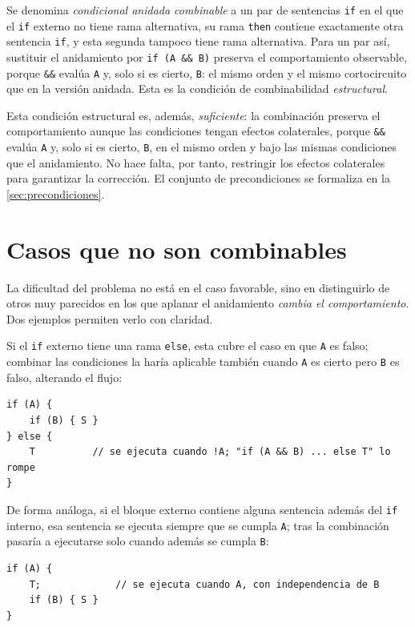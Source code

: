 Se denomina \emph{condicional anidada combinable} a un par de sentencias
\lstinline|if| en el que el \lstinline|if| externo no tiene rama alternativa,
su rama \lstinline|then| contiene exactamente otra sentencia \lstinline|if|, y
esta segunda tampoco tiene rama alternativa. Para un par así, sustituir el
anidamiento por \lstinline|if (A && B)| preserva el comportamiento observable,
porque \lstinline|&&| evalúa \lstinline|A| y, solo si es cierto,
\lstinline|B|: el mismo orden y el mismo cortocircuito que en la versión
anidada. Esta es la condición de combinabilidad \emph{estructural}.

Esta condición estructural es, además, \emph{suficiente}: la combinación
preserva el comportamiento aunque las condiciones tengan efectos colaterales,
porque \lstinline|&&| evalúa \lstinline|A| y, solo si es cierto, \lstinline|B|,
en el mismo orden y bajo las mismas condiciones que el anidamiento. No hace
falta, por tanto, restringir los efectos colaterales para garantizar la
corrección. El conjunto de
precondiciones se formaliza en la \autoref{sec:precondiciones}.

\section{Casos que no son combinables}
\label{sec:no-combinables}

La dificultad del problema no está en el caso favorable, sino en distinguirlo
de otros muy parecidos en los que aplanar el anidamiento \emph{cambia el
comportamiento}. Dos ejemplos permiten verlo con claridad.

Si el \lstinline|if| externo tiene una rama \lstinline|else|, esta cubre el
caso en que \lstinline|A| es falso; combinar las condiciones la haría
aplicable también cuando \lstinline|A| es cierto pero \lstinline|B| es falso,
alterando el flujo:

\begin{lstlisting}[caption={No combinable: \texttt{else} en el \texttt{if} externo.},label={lst:no-else}]
if (A) {
    if (B) { S }
} else {
    T          // se ejecuta cuando !A; "if (A && B) ... else T" lo rompe
}
\end{lstlisting}

De forma análoga, si el bloque externo contiene alguna sentencia además del
\lstinline|if| interno, esa sentencia se ejecuta siempre que se cumpla
\lstinline|A|; tras la combinación pasaría a ejecutarse solo cuando además se
cumpla \lstinline|B|:

\begin{lstlisting}[caption={No combinable: sentencia adicional en el bloque externo.},label={lst:no-extra}]
if (A) {
    T;             // se ejecuta cuando A, con independencia de B
    if (B) { S }
}
\end{lstlisting}

